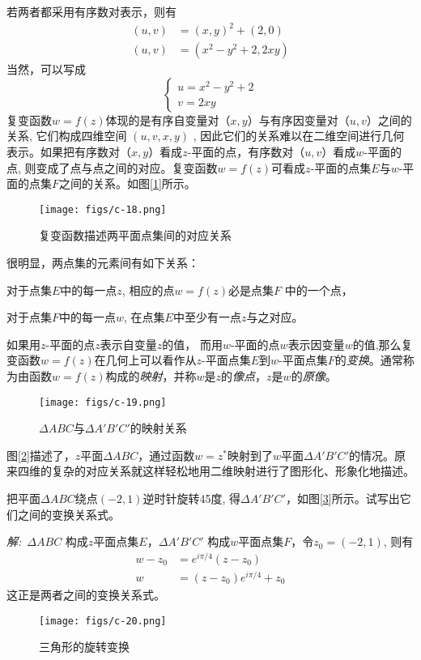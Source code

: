  若两者都采用有序数对表示，则有
\[ \begin{aligned}
  (u,v)&= (x,y)^2 +(2,0) \\ 
  (u,v)&= (x^2 -y^2 +2,2xy)
\end{aligned}\] 
当然，可以写成
\[ \begin{cases}
  u = x^2 -y^2 +2\\
  v = 2xy
\end{cases}\]
复变函数$w = f (z )$体现的是有序自变量对（$x,y$）与有序因变量对（$u,v$）之间的关系, 它们构成四维空间 $( u , v , x , y )$ , 因此它们的关系难以在二维空间进行几何表示。如果把有序数对（$x,y$）看成$z$-平面的点，有序数对（$u,v$）看成$w$-平面的点, 则变成了点与点之间的对应。复变函数$w = f (z )$可看成$z$-平面的点集$E$与$w$-平面的点集$F$之间的关系。如图[\ref{fig:twopoint}]所示。
\begin{figure}[ht]
	\centering
	  \texttt{[image: figs/c-18.png]}
      \caption{复变函数描述两平面点集间的对应关系}
      \label{fig:twopoint}
\end{figure}
很明显，两点集的元素间有如下关系：
\begin{compactitem}
    \item 对于点集$E$中的每一点$z$, 相应的点$w = f ( z )$必是点集$F$
    中的一个点，
    \item 对于点集$F$中的每一点$w$, 在点集$E$中至少有一点$z$与之对应。
 \end{compactitem}

\begin{definition}\label{}\index{}
	如果用$z$-平面的点$z$表示自变量$z$的值， 而用$w$-平面的点$w$表示因变量$w$的值,那么复变函数$w = f(z)$在几何上可以看作从$z$-平面点集$E$到$w$-平面点集$F$的\emph{变换}。通常称为由函数$w = f(z)$构成的\emph{映射}，并称$w$是$z$的\emph{像点}，$z$是$w$的\emph{原像}。 
\end{definition}
\begin{figure}[htbp]
	\centering
	\texttt{[image: figs/c-19.png]}
	\caption{$\Delta ABC $与$\Delta A'B'C' $的映射关系}
	\label{fig:twotri}
  \end{figure}
  图[\ref{fig:twotri}]描述了，$z$平面$\Delta ABC $，通过函数$w = z^* $映射到了$w$平面$\Delta A'B'C' $的情况。原来四维的复杂的对应关系就这样轻松地用二维映射进行了图形化、形象化地描述。

\begin{example}
    把平面$\Delta ABC $绕点$(-2,1)$逆时针旋转45度, 得$\Delta A'B'C' $，如图[\ref{fig:twotri2}]所示。试写出它们之间的变换关系式。
\end{example}
\emph{解:}~$\Delta ABC$ 构成$z$平面点集$E$，$\Delta A'B'C'$ 构成$w$平面点集$F$，令$z_0 = (-2,1)$, 则有
\[ \begin{aligned}
    w-z_0 &= e^{i\pi /4}(z-z_0) \\
    w &=  (z-z_0)e^{i\pi /4} + z_0
\end{aligned} \]  
这正是两者之间的变换关系式。
\begin{figure}[htbp]
    \centering
    \texttt{[image: figs/c-20.png]}
    \caption{三角形的旋转变换}
    \label{fig:twotri2}
   \end{figure}

